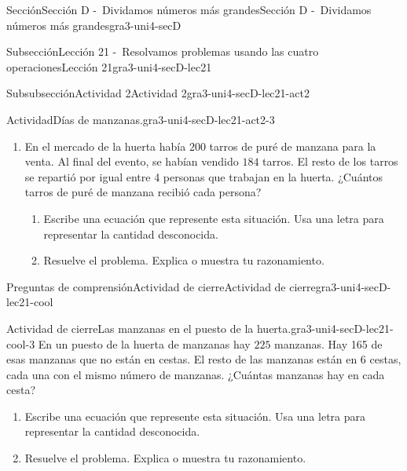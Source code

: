 \documentclass[twoside,10pt,]{article}
\begin{document}
\begin{sectionptx}{Sección}{Sección D -~Dividamos números más grandes}{}{Sección D -~Dividamos números más grandes}{}{}{gra3-uni4-secD}
\begin{subsectionptx}{Subsección}{Lección 21 -~Resolvamos problemas usando las cuatro operaciones}{}{Lección 21}{}{}{gra3-uni4-secD-lec21}
\begin{subsubsectionptx}{Subsubsección}{Actividad 2}{}{Actividad 2}{}{}{gra3-uni4-secD-lec21-act2}
\begin{activity}{Actividad}{Días de manzanas.}{gra3-uni4-secD-lec21-act2-3}
\begin{enumerate}
%
\begin{enumerate}
\item{}Escribe una ecuación que represente esta situación. Usa una letra para representar la cantidad desconocida.%
\item{}Resuelve el problema. Explica o muestra tu razonamiento.%
\end{enumerate}
\item{}En el mercado de la huerta había \(200\) tarros de puré de manzana para la venta. Al final del evento, se habían vendido \(184\) tarros. El resto de los tarros se repartió por igual entre 4 personas que trabajan en la huerta. ¿Cuántos tarros de puré de manzana recibió cada persona?%
%
\begin{enumerate}
\item{}Escribe una ecuación que represente esta situación. Usa una letra para representar la cantidad desconocida.%
\item{}Resuelve el problema. Explica o muestra tu razonamiento.%
\end{enumerate}
\end{enumerate}
\end{activity}%
\end{subsubsectionptx}
%
%
\typeout{************************************************}
\typeout{************************************************}
%
\begin{reading-questions-subsubsection}{Preguntas de comprensión}{Actividad de cierre}{}{Actividad de cierre}{}{}{gra3-uni4-secD-lec21-cool}
\begin{project}{Actividad de cierre}{Las manzanas en el puesto de la huerta.}{gra3-uni4-secD-lec21-cool-3}%
En un puesto de la huerta de manzanas hay \(225\) manzanas. Hay 165 de esas manzanas que no están en cestas. El resto de las manzanas están en \(6\) cestas, cada una con el mismo número de manzanas. ¿Cuántas manzanas hay en cada cesta?%
%
\begin{enumerate}[label=(\alph*)]
\item{}Escribe una ecuación que represente esta situación. Usa una letra para representar la cantidad desconocida.%
\item{}Resuelve el problema. Explica o muestra tu razonamiento.%
\end{enumerate}
\end{project}%
\end{reading-questions-subsubsection}
\end{subsectionptx}
%
%
\typeout{************************************************}

\end{sectionptx}
\end{document}
